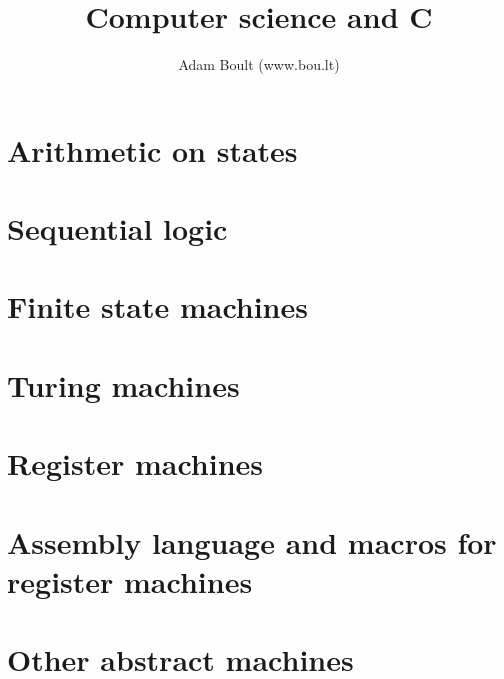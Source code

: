 \documentclass[oneside]{book}
\begin{document}
\author{Adam Boult (www.bou.lt)}
\title{Computer science and C}
\maketitle

\setcounter{tocdepth}{0}
\tableofcontents



\part{Arithmetic on states}






\part{Sequential logic}



\part{Finite state machines}



\part{Turing machines}



\part{Register machines}




\part{Assembly language and macros for register machines}


\part{Other abstract machines}





\end{document}
